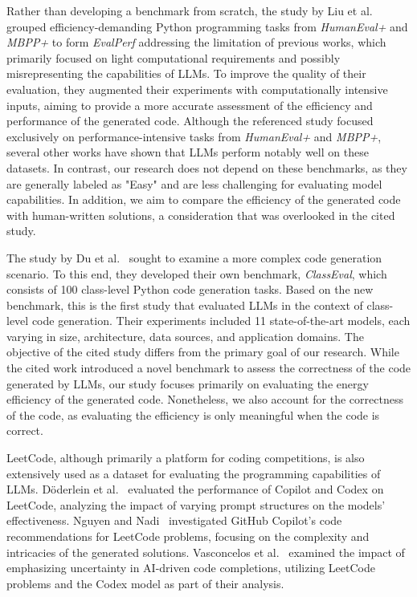 \par Rather than developing a benchmark from scratch, the study by Liu et al.~\cite{liu2024evaluatinglanguagemodelsefficient} grouped efficiency-demanding Python programming tasks from \textit{HumanEval+} and \textit{MBPP+} to form \textit{EvalPerf} addressing the limitation of previous works, which primarily focused on light computational requirements and possibly misrepresenting the capabilities of LLMs. To improve the quality of their evaluation, they augmented their experiments with computationally intensive inputs, aiming to provide a more accurate assessment of the efficiency and performance of the generated code. Although the referenced study focused exclusively on performance-intensive tasks from \textit{HumanEval+} and \textit{MBPP+}, several other works have shown that LLMs perform notably well on these datasets. In contrast, our research does not depend on these benchmarks, as they are generally labeled as "Easy" and are less challenging for evaluating model capabilities.  In addition, we aim to compare the efficiency of the generated code with human-written solutions, a consideration that was overlooked in the cited study.
\par The study by Du et al.~\cite{duCodeGen} sought to examine a more complex code generation scenario. To this end, they developed their own benchmark, \textit{ClassEval}, which consists of 100 class-level Python code generation tasks. Based on the new benchmark, this is the first study that evaluated LLMs in the context of class-level code generation. Their experiments included 11 state-of-the-art models, each varying in size, architecture, data sources, and application domains. The objective of the cited study differs from the primary goal of our research. While the cited work introduced a novel benchmark to assess the correctness of the code generated by LLMs, our study focuses primarily on evaluating the energy efficiency of the generated code. Nonetheless, we also account for the correctness of the code, as evaluating the efficiency is only meaningful when the code is correct.
\par LeetCode, although primarily a platform for coding competitions,  is also extensively used as a dataset for evaluating the programming capabilities of LLMs. Döderlein et al.~\cite{Dderlein2022PilotingCA} evaluated the performance of Copilot and Codex on LeetCode, analyzing the impact of varying prompt structures on the models' effectiveness. Nguyen and Nadi~\cite{9796235} investigated GitHub Copilot's code recommendations for LeetCode problems, focusing on the complexity and intricacies of the generated solutions. Vasconcelos et al.~\cite{10.1145/3702320} examined the impact of emphasizing uncertainty in AI-driven code completions, utilizing LeetCode problems and the Codex model as part of their analysis.


